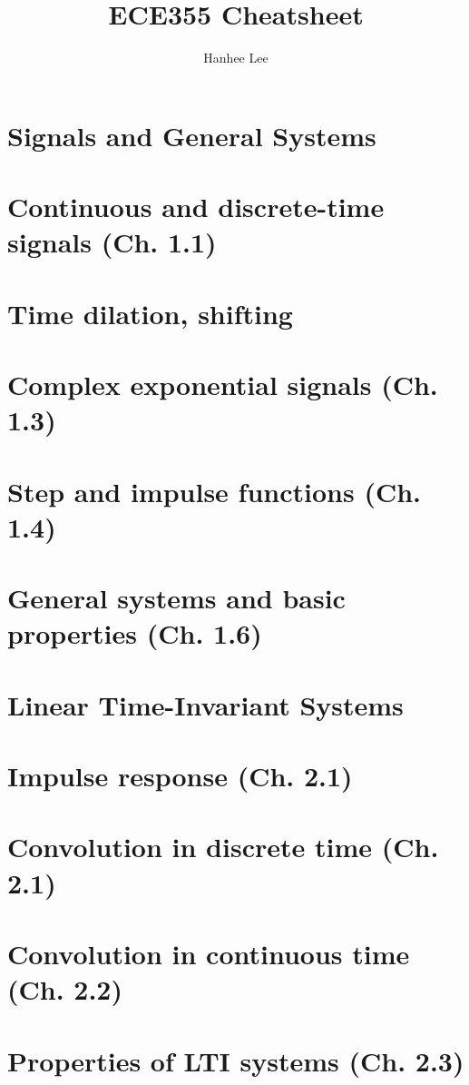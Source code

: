 \documentclass{article}
\title{ECE355 Cheatsheet}
\author{Hanhee Lee}
\begin{document}
\maketitle

\tableofcontents

\listoffigures

\listoftables

\section*{Signals and General Systems}
\section{Continuous and discrete-time signals (Ch. 1.1)}
\section{Time dilation, shifting}
\section{Complex exponential signals (Ch. 1.3)}
\section{Step and impulse functions (Ch. 1.4)}
\section{General systems and basic properties (Ch. 1.6)}

\section*{Linear Time-Invariant Systems}
\section{Impulse response (Ch. 2.1)}
\section{Convolution in discrete time (Ch. 2.1)}
\section{Convolution in continuous time (Ch. 2.2)}
\section{Properties of LTI systems (Ch. 2.3)} %
\end{document}
